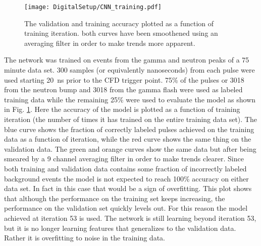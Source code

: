 \documentclass[main.tex]{subfiles}
\begin{document}
\begin{figure}[ht!]
    \centering
        \texttt{[image: DigitalSetup/CNN\_training.pdf]}
        \caption[Training and validation accuracy of the CNN]{The validation and training accuracy plotted as a function of training iteration. both curves have been smoothened using an averaging filter in order to make trends more apparent.}
    \label{fig:CNN_training} 
\end{figure}

The network was trained on events from the gamma and neutron peaks of a 75 minute data set. 300 samples (or equivalently nanoseconds) from each pulse were used starting \SI{20}{ns} prior to the CFD trigger point. 75\% of the pulses or 3018 from the neutron bump and 3018 from the gamma flash were used as labeled training data while the remaining 25\% were used to evaluate the model as shown in Fig. \ref{fig:CNN_training}. Here the accuracy of the model is plotted as a function of training iteration (the number of times it has trained on the entire training data set). The blue curve shows the fraction of correctly labeled pulses achieved on the training data as a function of iteration, while the red curve shows the same thing on the validation data. The green and orange curves show the same data but after being smeared by a 9 channel averaging filter in order to make trends clearer. Since both training and validation data contains some fraction of incorrectly labeled background events the model is not expected to reach 100\% accuracy on either data set. In fact in this case that would be a sign of overfitting. This plot shows that although the performance on the training set keeps increasing, the performance on the validation set quickly levels out. For this reason the model achieved at iteration 53 is used. The network is still learning beyond iteration 53, but it is no longer learning features that generalizes to the validation data. Rather it is overfitting to noise in the training data.
\end{document}
